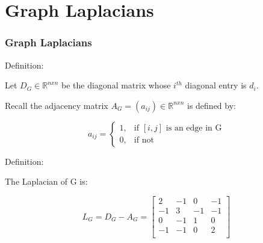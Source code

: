 \documentclass{beamer}
\begin{document}

\section{Graph Laplacians}
\begin{frame}
\frametitle{\textbf{Graph Laplacians} }
Definition: \vspace{0.5 cm}

Let $D_{G} \in \mathbb{R}^{nxn}$ be the diagonal matrix whose $i^{th}$ diagonal entry is $d_{i}$. \vspace{0.5 cm}


Recall the adjacency matrix $A_{G} = \left(a_{ij}\right) \in \mathbb{R}^{nxn}$ is defined by: \vspace{0.2 cm}

\[
    a_{ij}= 
\begin{cases}
    1 , & \text{if } [i,j] \text{ is an edge in G}\\
    0 , & \text{if not} 
\end{cases}
\]

Definition:

The Laplacian of G is:

\[
L_{G} = D_{G} - A_{G} = 
\left\lbrack\begin{array}{cccc}
    2  & -1 & 0  & -1 \\
    -1 & 3  & -1 & -1 \\
    0  & -1 & 1  & 0  \\
    -1 & -1 & 0  & 2  \\
\end{array}\right\rbrack
\]

\end{frame}

\end{document}
